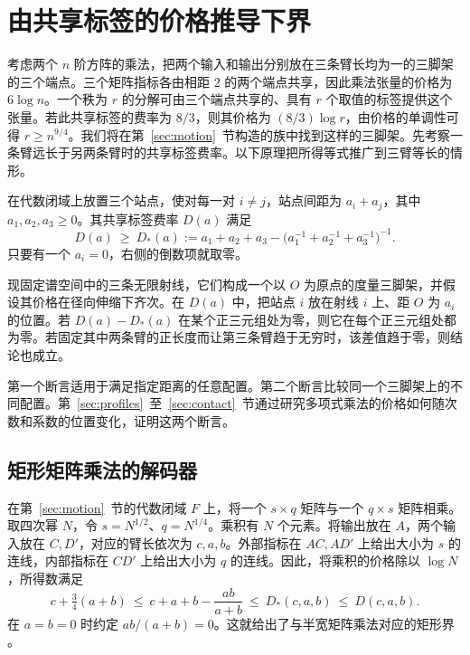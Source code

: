 \section{由共享标签的价格推导下界}\label{sec:boundary}

考虑两个 \(n\) 阶方阵的乘法，把两个输入和输出分别放在三条臂长均为一的三脚架的三个端点。三个矩阵指标各由相距 \(2\) 的两个端点共享，因此乘法张量的价格为 \(6\log n\)。一个秩为 \(r\) 的分解可由三个端点共享的、具有 \(r\) 个取值的标签提供这个张量。若此共享标签的费率为 \(8/3\)，则其价格为 \((8/3)\log r\)，由价格的单调性可得 \(r\ge n^{9/4}\)。我们将在第~\ref{sec:motion}~节构造的族中找到这样的三脚架。先考察一条臂远长于另两条臂时的共享标签费率。以下原理把所得等式推广到三臂等长的情形。

\begin{proposition}[三脚架原理]\label{prop:tripod}
在代数闭域上放置三个站点，使对每一对 \(i\ne j\)，站点间距为 \(a_i+a_j\)，其中 \(a_1,a_2,a_3\ge0\)。其共享标签费率 \(D(a)\) 满足
\[
       D(a)\ \ge\ D_*(a)
       :=a_1+a_2+a_3-\bigl(a_1^{-1}+a_2^{-1}+a_3^{-1}\bigr)^{-1}.
\]
只要有一个 \(a_i=0\)，右侧的倒数项就取零。

现固定谱空间中的三条无限射线，它们构成一个以 \(O\) 为原点的度量三脚架，并假设其价格在径向伸缩下齐次。在 \(D(a)\) 中，把站点 \(i\) 放在射线 \(i\) 上、距 \(O\) 为 \(a_i\) 的位置。若 \(D(a)-D_*(a)\) 在某个正三元组处为零，则它在每个正三元组处都为零。若固定其中两条臂的正长度而让第三条臂趋于无穷时，该差值趋于零，则结论也成立。
\end{proposition}

第一个断言适用于满足指定距离的任意配置。第二个断言比较同一个三脚架上的不同配置。第~\ref{sec:profiles}~至~\ref{sec:contact}~节通过研究多项式乘法的价格如何随次数和系数的位置变化，证明这两个断言。

\subsection{矩形矩阵乘法的解码器}

在第~\ref{sec:motion}~节的代数闭域 \(F\) 上，将一个 \(s\times q\) 矩阵与一个 \(q\times s\) 矩阵相乘。取四次幂 \(N\)，令 \(s=N^{1/2}\)、\(q=N^{1/4}\)。乘积有 \(N\) 个元素。将输出放在 \(A\)，两个输入放在 \(C,D'\)，对应的臂长依次为 \(c,a,b\)。外部指标在 \(AC,AD'\) 上给出大小为 \(s\) 的连线，内部指标在 \(CD'\) 上给出大小为 \(q\) 的连线。因此，将乘积的价格除以 \(\log N\)，所得数满足
\[
   c+\tfrac34(a+b)
   \ \le\ c+a+b-\frac{ab}{a+b}
   \ \le\ D_*(c,a,b)\ \le\ D(c,a,b).
\]
在 \(a=b=0\) 时约定 \(ab/(a+b)=0\)。这就给出了与半宽矩阵乘法对应的矩形界 \cite{uznanski,abvz}。

